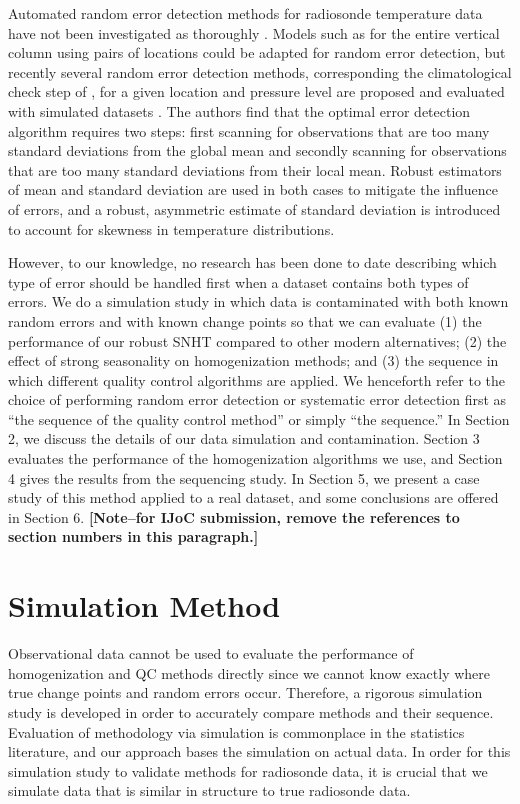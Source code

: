 \documentclass[12pt]{article}
\begin{document}
\begin{doublespacing}
Automated random error detection methods for radiosonde temperature data have not been investigated as thoroughly \cite{durre06,durre08,lanzante96}.  Models such as \cite{ignaccolo14} for  the entire vertical column using pairs of locations could be adapted for random error detection, but  recently  several random error detection methods, corresponding the climatological check step of \cite{durre08}, for a given location and pressure level are proposed and evaluated with simulated datasets \cite{bell14}.    The authors find that the optimal error detection algorithm requires two steps: first scanning for observations that are too many standard deviations from the global mean and secondly scanning for observations that are too many standard deviations from their local mean.  Robust estimators of mean and standard deviation are used in both cases to mitigate the influence of errors, and a robust, asymmetric estimate of standard deviation is introduced to account for skewness in temperature distributions.

However, to our knowledge, no research has been done to date describing which type of error should be handled first when a dataset contains both types of errors.  We do a simulation study in which data is contaminated with both known random errors and with known change points so that we can  evaluate  (1) the performance of our robust SNHT compared to other modern alternatives; (2) the effect of strong seasonality on homogenization methods; and (3) the sequence in which different quality control algorithms are applied.  We henceforth refer to the choice of performing random error detection or systematic error detection first  as ``the sequence of the quality control method'' or simply ``the sequence.''  In Section 2, we discuss the details of our data simulation and contamination.  Section 3 evaluates the performance of the homogenization algorithms we use, and Section 4 gives the results from the sequencing study.  In Section 5, we present a case study of this method applied to a real dataset, and some conclusions are offered in Section 6.  \textbf{[Note--for IJoC submission, remove the references to section numbers in this paragraph.]}

\section{Simulation Method}
Observational data cannot be used to evaluate the performance of  homogenization and QC methods directly since we cannot know exactly where true change points and random errors occur.  Therefore, a rigorous simulation study is developed in order to accurately compare methods and their sequence.  Evaluation of methodology via simulation is commonplace in the statistics literature, and our approach bases the simulation on actual data.  In order for this simulation study to validate methods for radiosonde data, it is crucial that we simulate data that is similar in structure to true radiosonde data.


\end{doublespacing}
\end{document}
